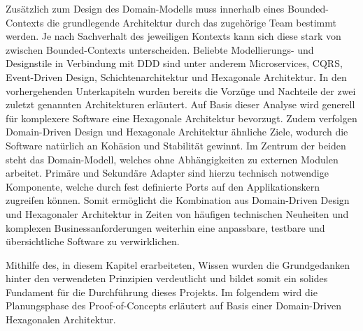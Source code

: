 
Zusätzlich zum Design des Domain-Modells muss innerhalb eines Bounded-Contexts die grundlegende Architektur durch das zugehörige Team bestimmt werden. Je nach Sachverhalt des jeweiligen Kontexts kann sich diese stark von zwischen Bounded-Contexts unterscheiden. Beliebte Modellierungs- und Designstile in Verbindung mit DDD sind unter anderem Microservices, CQRS, Event-Driven Design, Schichtenarchitektur und Hexagonale Architektur. In den vorhergehenden Unterkapiteln wurden bereits die Vorzüge und Nachteile der zwei zuletzt genannten Architekturen erläutert. Auf Basis dieser Analyse wird generell für komplexere Software eine Hexagonale Architektur bevorzugt. Zudem verfolgen Domain-Driven Design und Hexagonale Architektur ähnliche Ziele, wodurch die Software natürlich an Kohäsion und Stabilität gewinnt. Im Zentrum der beiden steht das Domain-Modell, welches ohne Abhängigkeiten zu externen Modulen arbeitet. Primäre und Sekundäre Adapter sind hierzu technisch notwendige Komponente, welche durch fest definierte Ports auf den Applikationskern zugreifen können. Somit ermöglicht die Kombination aus Domain-Driven Design und Hexagonaler Architektur in Zeiten von häufigen technischen Neuheiten und komplexen Businessanforderungen weiterhin eine anpassbare, testbare und übersichtliche Software zu verwirklichen.

Mithilfe des, in diesem Kapitel erarbeiteten, Wissen wurden die Grundgedanken hinter den verwendeten Prinzipien verdeutlicht und bildet somit ein solides Fundament für die Durchführung dieses Projekts. Im folgendem wird die Planungsphase des Proof-of-Concepts erläutert auf Basis einer Domain-Driven Hexagonalen Architektur.


















































